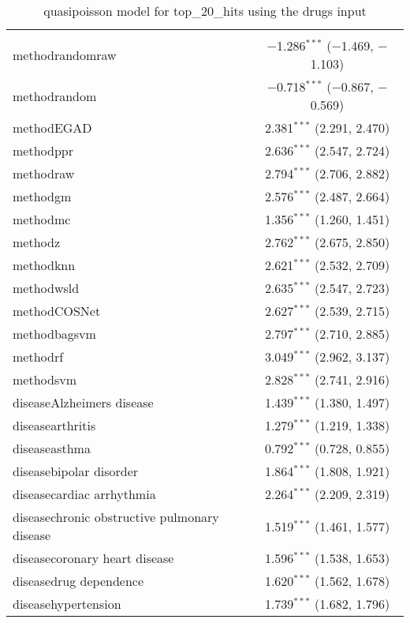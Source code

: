 
\begin{table}[!htbp] \centering 
  \caption{quasipoisson model for top_20_hits using the drugs input} 
  \label{} 
\begin{tabular}{@{\extracolsep{5pt}}lc} 
\\[-1.8ex]\hline 
\hline \\[-1.8ex] 
 methodrandomraw & $-$1.286$^{***}$ ($-$1.469, $-$1.103) \\ 
  methodrandom & $-$0.718$^{***}$ ($-$0.867, $-$0.569) \\ 
  methodEGAD & 2.381$^{***}$ (2.291, 2.470) \\ 
  methodppr & 2.636$^{***}$ (2.547, 2.724) \\ 
  methodraw & 2.794$^{***}$ (2.706, 2.882) \\ 
  methodgm & 2.576$^{***}$ (2.487, 2.664) \\ 
  methodmc & 1.356$^{***}$ (1.260, 1.451) \\ 
  methodz & 2.762$^{***}$ (2.675, 2.850) \\ 
  methodknn & 2.621$^{***}$ (2.532, 2.709) \\ 
  methodwsld & 2.635$^{***}$ (2.547, 2.723) \\ 
  methodCOSNet & 2.627$^{***}$ (2.539, 2.715) \\ 
  methodbagsvm & 2.797$^{***}$ (2.710, 2.885) \\ 
  methodrf & 3.049$^{***}$ (2.962, 3.137) \\ 
  methodsvm & 2.828$^{***}$ (2.741, 2.916) \\ 
  diseaseAlzheimers disease & 1.439$^{***}$ (1.380, 1.497) \\ 
  diseasearthritis & 1.279$^{***}$ (1.219, 1.338) \\ 
  diseaseasthma & 0.792$^{***}$ (0.728, 0.855) \\ 
  diseasebipolar disorder & 1.864$^{***}$ (1.808, 1.921) \\ 
  diseasecardiac arrhythmia & 2.264$^{***}$ (2.209, 2.319) \\ 
  diseasechronic obstructive pulmonary disease & 1.519$^{***}$ (1.461, 1.577) \\ 
  diseasecoronary heart disease & 1.596$^{***}$ (1.538, 1.653) \\ 
  diseasedrug dependence & 1.620$^{***}$ (1.562, 1.678) \\ 
  diseasehypertension & 1.739$^{***}$ (1.682, 1.796) \\ 

\end{tabular}
\end{table}
